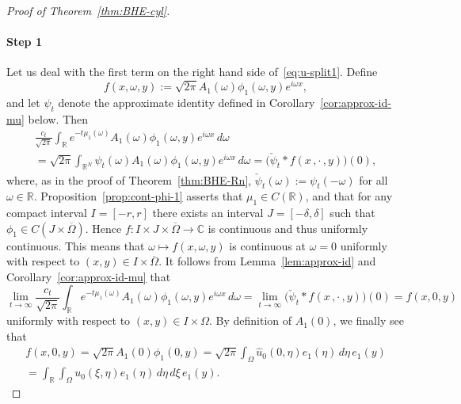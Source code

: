 \documentclass[a4paper, reqno,titlepage]{amsart}
\numberwithin{equation}{section}
\theoremstyle{plain}
\theoremstyle{definition}
\theoremstyle{remark}
\newcommand{\RR}{\mathbb{R}}
\newcommand{\CC}{\mathbb{C}}
\begin{document}
\begin{proof}[Proof of Theorem~\ref{thm:BHE-cyl}]
  \paragraph{Step 1}
  Let us deal with the first term on the right hand side of~\eqref{eq:u-split1}. Define
  \begin{equation*}
    f(x,\omega,y):=\sqrt{2\pi}A_1(\omega)\phi_1(\omega,y)e^{i\omega x},
  \end{equation*}
  and let $\psi_t$ denote the approximate identity defined in Corollary~\ref{cor:approx-id-mu} below. Then
  \begin{multline*}
    \frac{c_t}{\sqrt{2\pi}}\int_{\RR} e^{-t \mu_1(\omega)} A_1(\omega) \phi_1(\omega, y) e^{i\omega x} \,d\omega\\
    =\sqrt{2\pi}\int_{\RR^N}\psi_t(\omega)A_1(\omega) \phi_1(\omega, y) e^{i\omega x} \,d\omega
    =\bigl(\check\psi_t*f(x\,,\cdot\,,y)\bigr)(0),
  \end{multline*}
  where, as in the proof of Theorem~\ref{thm:BHE-Rn}, $\check\psi_t(\omega):=\psi_t(-\omega)$ for all $\omega\in\RR$.  Proposition~\ref{prop:cont-phi-1} asserts that $\mu_1\in C(\RR)$, and that for any compact interval $I=[-r,r]$ there exists an interval $J = [-\delta,\delta]$ such that $\phi_1\in C(J\times\overline{\Omega})$. Hence $f\colon I\times J\times\overline{\Omega} \to \CC$ is continuous and thus uniformly continuous. This means that $\omega\mapsto f(x,\omega,y)$ is continuous at $\omega=0$ uniformly with respect to $(x,y)\in I\times\overline{\Omega}$. It follows from Lemma~\ref{lem:approx-id} and Corollary~\ref{cor:approx-id-mu} that
  \begin{equation*}
    \lim_{t\to\infty}\frac{c_t}{\sqrt{2\pi}}\int_{\RR} e^{-t \mu_1(\omega)} A_1(\omega) \phi_1(\omega, y) e^{i\omega x} \,d\omega
    =\lim_{t\to\infty}\bigl(\check\psi_t*f(x\,,\cdot\,,y)\bigr)(0)
    =f(x,0,y)
  \end{equation*}
  uniformly with respect to $(x,y)\in I\times\Omega$. By definition of $A_1(0)$, we finally see that
  \begin{multline*}
    f(x,0,y)
    =\sqrt{2\pi}A_1(0)\phi_1(0,y)
    =\sqrt{2\pi}\int_{\Omega}\hat u_0(0,\eta)e_1(\eta)\,d\eta\, e_1(y)\\
    =\int_{\RR}\int_{\Omega}u_0(\xi,\eta)e_1(\eta)\,d\eta\,d\xi\, e_1(y).
  \end{multline*}


\end{proof}
\end{document}
